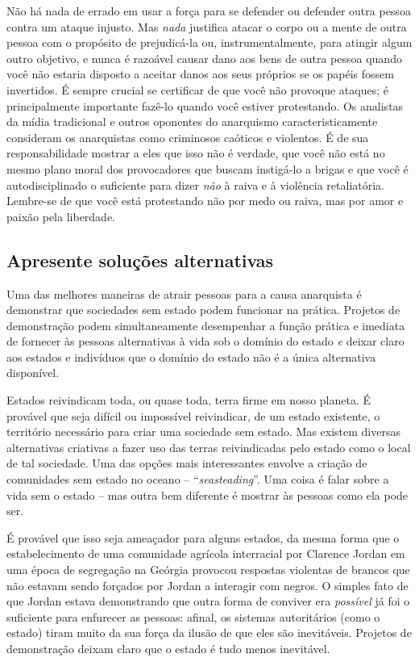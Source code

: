 Não há nada de errado em usar a força para se defender ou defender outra pessoa contra um ataque injusto. Mas \emph{nada} justifica atacar o corpo ou a mente de outra pessoa com o propósito de prejudicá-la ou, instrumentalmente, para atingir algum outro objetivo, e nunca é razoável causar dano aos bens de outra pessoa quando você não estaria disposto a aceitar danos aos seus próprios se os papéis fossem invertidos. É sempre crucial se certificar de que você não provoque ataques; é principalmente importante fazê-lo quando você estiver protestando. Os analistas da mídia tradicional e outros oponentes do anarquismo caracteristicamente consideram os anarquistas como criminosos caóticos e violentos. É de sua responsabilidade mostrar a eles que isso não é verdade, que você não está no mesmo plano moral dos provocadores que buscam instigá-lo a brigas e que você é autodisciplinado o suficiente para dizer \emph{não} à raiva e à violência retaliatória. Lembre-se de que você está protestando não por medo ou raiva, mas por amor e paixão pela liberdade.

\subsection*{Apresente soluções alternativas}

Uma das melhores maneiras de atrair pessoas para a causa anarquista é demonstrar que sociedades sem estado podem funcionar na prática. Projetos de demonstração podem simultaneamente desempenhar a função prática e imediata de fornecer às pessoas alternativas à vida sob o domínio do estado \emph{e} deixar claro aos estados e indivíduos que o domínio do estado não é a única alternativa disponível.

Estados reivindicam toda, ou quase toda, terra firme em nosso planeta. É provável que seja difícil ou impossível reivindicar, de um estado existente, o território necessário para criar uma sociedade sem estado. Mas existem diversas alternativas criativas a fazer uso das terras reivindicadas pelo estado como o local de tal sociedade. Uma das opções mais interessantes envolve a criação de comunidades sem estado no oceano -- ``\emph{seasteading}''. Uma coisa é falar sobre a vida sem o estado -- mas outra bem diferente é mostrar às pessoas como ela pode ser.

É provável que isso seja ameaçador para alguns estados, da mesma forma que o estabelecimento de uma comunidade agrícola interracial por Clarence Jordan em uma época de segregação na Geórgia provocou respostas violentas de brancos que não estavam sendo forçados por Jordan a interagir com negros. O simples fato de que Jordan estava demonstrando que outra forma de conviver era \emph{possível} já foi o suficiente para enfurecer as pessoas: afinal, os sistemas autoritários (como o estado) tiram muito da sua força da ilusão de que eles são inevitáveis. Projetos de demonstração deixam claro que o estado é tudo menos inevitável.

